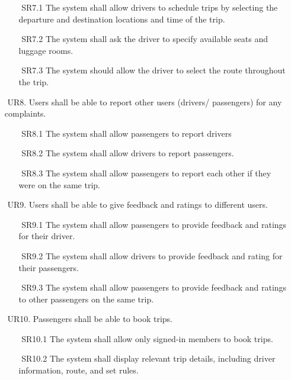\documentclass[a4paper, 12pt]{report} %
\begin{document}
\begin{itemize}
                \begin{itemize}
                    \item [$ $] SR7.1 The system shall allow drivers to schedule trips by selecting the departure and destination locations and time of the trip.
                    \item [$ $] SR7.2  The system shall ask the driver to specify available seats and luggage rooms.
                    \item [$ $] SR7.3  The system should allow the driver to select the route throughout the trip.
                \end{itemize}
                \item [$ $] UR8. Users shall be able to report other users (drivers/ passengers) for any complaints. 
                \begin{itemize}
                    \item [$ $] SR8.1 The system shall allow passengers to report drivers 
                    \item [$ $] SR8.2 The system shall allow drivers to report passengers.
                    \item [$ $] SR8.3 The system shall allow passengers to report each other if they were on the same trip.
                    \end{itemize}
                \item [$ $] UR9. Users shall be able to give feedback and ratings to different users.
                \begin{itemize}
                    \item [$ $] SR9.1 The system shall allow passengers to provide feedback and ratings for their driver.
                    \item [$ $] SR9.2  The system shall allow drivers to provide feedback and rating for their passengers.
                    \item [$ $] SR9.3 The system shall allow passengers to provide feedback and ratings to other passengers on the same trip.
                \end{itemize}
                \item [$ $] UR10. Passengers shall be able to book trips.
                \begin{itemize}
                    \item [$ $] SR10.1 The system shall allow only signed-in members to book trips.
                    \item [$ $] SR10.2  The system shall display relevant trip details, including driver information, route, and set rules. 

\end{itemize}
\end{itemize}
\end{document}
